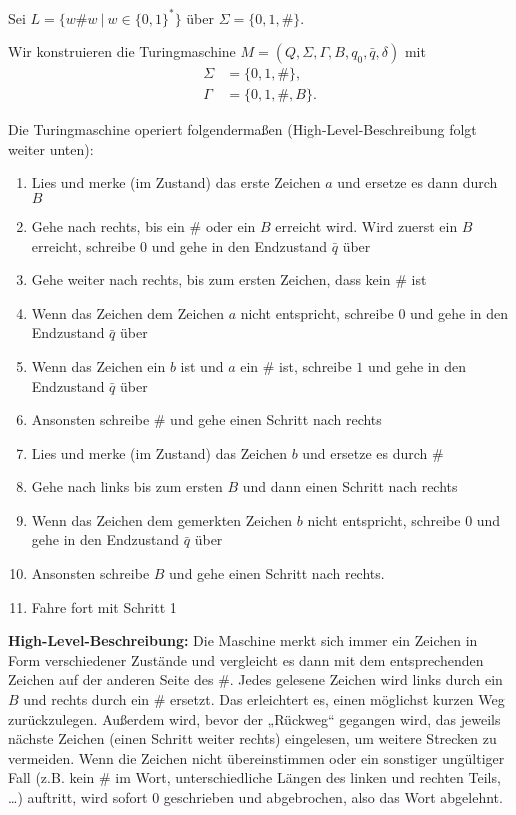 Sei $L = \{w\#w\ |\ w \in \{0, 1\} ^{\ast}\}$ über $\Sigma = \{0, 1, \#\}$.


Wir konstruieren die Turingmaschine $M = (Q, \Sigma, \Gamma, B, q_0, \bar{q},
	\delta)$ mit
\begin{align*}
	\Sigma &= \{0, 1, \#\}, \\
	\Gamma &= \{0, 1, \#, B\}.
\end{align*}

Die Turingmaschine operiert folgendermaßen (High-Level-Beschreibung folgt weiter
unten):

\begin{enumerate}
	\item Lies und merke (im Zustand) das erste Zeichen $a$ und ersetze es dann
		durch $B$
	\item Gehe nach rechts, bis ein $\#$ oder ein $B$ erreicht wird. Wird zuerst
		ein	$B$ erreicht, schreibe $0$ und gehe in den Endzustand $\bar{q}$ über
	\item Gehe weiter nach rechts, bis zum ersten Zeichen, dass kein $\#$ ist
	\item Wenn das Zeichen dem Zeichen $a$ nicht entspricht, schreibe $0$ und
		gehe in den Endzustand $\bar{q}$ über
	\item Wenn das Zeichen ein $b$ ist und $a$ ein $\#$ ist, schreibe $1$ und
		gehe in den Endzustand $\bar{q}$ über
	\item Ansonsten schreibe $\#$ und gehe einen Schritt nach rechts
	\item Lies und merke (im Zustand) das Zeichen $b$ und ersetze es durch $\#$
	\item Gehe nach links bis zum ersten $B$ und dann einen Schritt nach rechts
	\item Wenn das Zeichen dem gemerkten Zeichen $b$ nicht entspricht, schreibe
		$0$ und gehe in den Endzustand $\bar{q}$ über
	\item Ansonsten schreibe $B$ und gehe einen Schritt nach rechts.
	\item Fahre fort mit Schritt 1
\end{enumerate}

\textbf{High-Level-Beschreibung:} Die Maschine merkt sich immer ein Zeichen in
Form verschiedener Zustände und vergleicht es dann mit dem entsprechenden
Zeichen auf der anderen Seite des $\#$. Jedes gelesene Zeichen wird links durch
ein $B$ und rechts durch ein $\#$ ersetzt. Das erleichtert es, einen möglichst
kurzen Weg zurückzulegen. Außerdem wird, bevor der „Rückweg“ gegangen wird, das
jeweils nächste Zeichen (einen Schritt weiter rechts) eingelesen, um weitere
Strecken zu vermeiden. Wenn die Zeichen nicht übereinstimmen oder ein sonstiger
ungültiger Fall (z.B. kein $\#$ im Wort, unterschiedliche Längen des linken und
rechten Teils, \dots) auftritt, wird sofort $0$ geschrieben und abgebrochen,
also das Wort abgelehnt.

